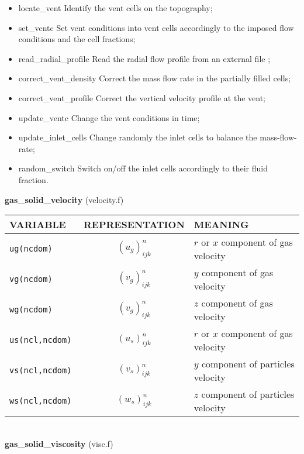 \begin{itemize}
\item {locate\_vent} Identify the vent cells on the topography;
\item {set\_ventc} Set vent conditions into vent cells accordingly to the imposed flow conditions and the cell fractions;
\item {read\_radial\_profile} Read the radial flow profile from an external file ;
\item {correct\_vent\_density} Correct the mass flow rate in the partially filled cells;
\item {correct\_vent\_profile} Correct the vertical velocity profile at the vent;
\item {update\_ventc} Change the vent conditions in time;
\item {update\_inlet\_cells} Change randomly the inlet cells to balance the mass-flow-rate;
\item {random\_switch} Switch on/off the inlet cells accordingly to their fluid fraction.
\end{itemize}
%
%
{\large {\bf gas\_solid\_velocity}} (velocity.f)\\[5mm]
\begin{tabular}{|p{6cm}|c|p{6cm}|}\hline
VARIABLE & REPRESENTATION & MEANING\\\hline
\tt ug(ncdom) & $(u_g)^n_{ijk}$ &   $r$ or $x$ component of gas velocity\\\hline
\tt vg(ncdom) & $(v_g)^n_{ijk}$ &  $y$ component of gas velocity\\\hline
\tt wg(ncdom) & $(v_g)^n_{ijk}$ &  $z$ component of gas velocity\\\hline
\tt us(ncl,ncdom) & $(u_s)^n_{ijk}$ &   $r$ or $x$ component of gas velocity\\\hline
\tt vs(ncl,ncdom) & $(v_s)^n_{ijk}$ &  $y$ component of particles velocity\\\hline
\tt ws(ncl,ncdom) & $(w_s)^n_{ijk}$ &  $z$ component of particles velocity\\\hline
\end{tabular}\\[5mm]
%
%
{\large{\bf gas\_solid\_viscosity}} (visc.f)\\[5mm]
